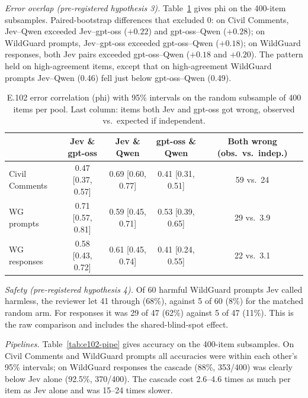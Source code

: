 \documentclass[11pt]{article}
\renewcommand{\_}{\origunderscore\allowbreak}
\begin{document}
\emph{Error overlap (pre-registered hypothesis 3).} Table~\ref{tab:e102-phi} gives phi on the 400-item subsamples. Paired-bootstrap differences that excluded 0: on Civil Comments, Jev--Qwen exceeded Jev--gpt-oss ($+0.22$) and gpt-oss--Qwen ($+0.28$); on WildGuard prompts, Jev--gpt-oss exceeded gpt-oss--Qwen ($+0.18$); on WildGuard responses, both Jev pairs exceeded gpt-oss--Qwen ($+0.18$ and $+0.20$). The pattern held on high-agreement items, except that on high-agreement WildGuard prompts Jev--Qwen (0.46) fell just below gpt-oss--Qwen (0.49).

\begin{table}[H]
\centering
\small
\caption{E.102 error correlation (phi) with 95\% intervals on the random subsample of 400 items per pool. Last column: items both Jev and gpt-oss got wrong, observed vs.\ expected if independent.}
\label{tab:e102-phi}
\begin{tabular}{lcccc}
\toprule
 & Jev \& gpt-oss & Jev \& Qwen & gpt-oss \& Qwen & Both wrong (obs.\ vs.\ indep.) \\
\midrule
Civil Comments & 0.47 [0.37, 0.57] & 0.69 [0.60, 0.77] & 0.41 [0.31, 0.51] & 59 vs.\ 24 \\
WG prompts & 0.71 [0.57, 0.81] & 0.59 [0.45, 0.71] & 0.53 [0.39, 0.65] & 29 vs.\ 3.9 \\
WG responses & 0.58 [0.43, 0.72] & 0.61 [0.45, 0.74] & 0.41 [0.24, 0.55] & 22 vs.\ 3.1 \\
\bottomrule
\end{tabular}
\end{table}

\emph{Safety (pre-registered hypothesis 4).} Of 60 harmful WildGuard prompts Jev called harmless, the reviewer let 41 through (68\%), against 5 of 60 (8\%) for the matched random arm. For responses it was 29 of 47 (62\%) against 5 of 47 (11\%). This is the raw comparison and includes the shared-blind-spot effect.

\emph{Pipelines.} Table~\ref{tab:e102-pipe} gives accuracy on the 400-item subsamples. On Civil Comments and WildGuard prompts all accuracies were within each other's 95\% intervals; on WildGuard responses the cascade (88\%, 353/400) was clearly below Jev alone (92.5\%, 370/400). The cascade cost 2.6--4.6 times as much per item as Jev alone and was 15--24 times slower.
\end{document}
